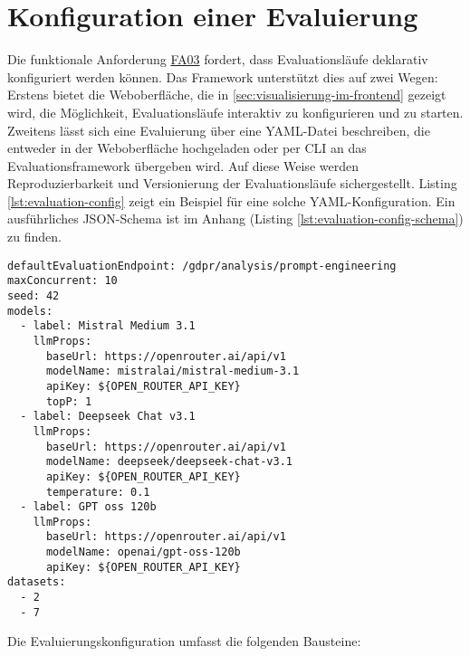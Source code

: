 \section{Konfiguration einer Evaluierung}\label{sec:konfiguration-einer-evaluierung}

Die funktionale Anforderung \hyperlink{FA03}{FA03} fordert, dass Evaluationsläufe deklarativ konfiguriert werden können. Das Framework unterstützt dies auf zwei Wegen:
Erstens bietet die Weboberfläche, die in \ref{sec:visualisierung-im-frontend} gezeigt wird, die Möglichkeit, Evaluationsläufe interaktiv zu konfigurieren und zu starten.
Zweitens lässt sich eine Evaluierung über eine YAML-Datei beschreiben, die entweder in der Weboberfläche hochgeladen oder per CLI an das Evaluationsframework übergeben wird. Auf diese Weise werden Reproduzierbarkeit und Versionierung der Evaluationsläufe sichergestellt. Listing \ref{lst:evaluation-config} zeigt ein Beispiel für eine solche YAML-Konfiguration. Ein ausführliches JSON-Schema ist im Anhang (Listing \ref{lst:evaluation-config-schema}) zu finden.

\begin{lstlisting}[caption={Beispiel einer Evaluierungskonfiguration in YAML.},label={lst:evaluation-config}]
defaultEvaluationEndpoint: /gdpr/analysis/prompt-engineering
maxConcurrent: 10
seed: 42
models:
  - label: Mistral Medium 3.1
    llmProps:
      baseUrl: https://openrouter.ai/api/v1
      modelName: mistralai/mistral-medium-3.1
      apiKey: ${OPEN_ROUTER_API_KEY}
      topP: 1
  - label: Deepseek Chat v3.1
    llmProps:
      baseUrl: https://openrouter.ai/api/v1
      modelName: deepseek/deepseek-chat-v3.1
      apiKey: ${OPEN_ROUTER_API_KEY}
      temperature: 0.1
  - label: GPT oss 120b
    llmProps:
      baseUrl: https://openrouter.ai/api/v1
      modelName: openai/gpt-oss-120b
      apiKey: ${OPEN_ROUTER_API_KEY}
datasets:
  - 2
  - 7
\end{lstlisting}

Die Evaluierungskonfiguration umfasst die folgenden Bausteine:

